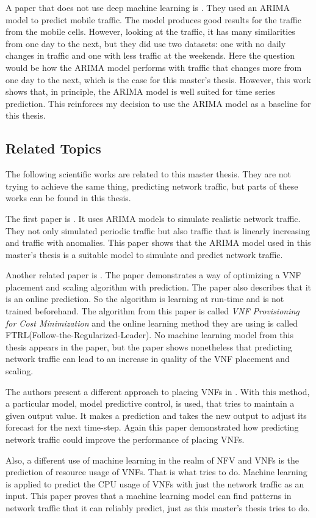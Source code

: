 A paper that does not use deep machine learning is \cite{mobileARIMA}.
They used an ARIMA model to predict mobile traffic.
The model produces good results for the traffic from the mobile cells.
However, looking at the traffic, it has many similarities from one day to the next, but they did use two datasets: one with no daily changes in traffic and one with less traffic at the weekends.
Here the question would be how the ARIMA model performs with traffic that changes more from one day to the next, which is the case for this master's thesis.
However, this work shows that, in principle, the ARIMA model is well suited for time series prediction.
This reinforces my decision to use the ARIMA model as a baseline for this thesis.

\subsection{Related Topics}
The following scientific works are related to this master thesis. They are not trying to achieve the same thing, predicting network traffic, but parts of these works can be found in this thesis.

The first paper is \cite{ArimaTraffic}.
It uses ARIMA models to simulate realistic network traffic.
They not only simulated periodic traffic but also traffic that is linearly increasing and traffic with anomalies.
This paper shows that the ARIMA model used in this master's thesis is a suitable model to simulate and predict network traffic.

Another related paper is \cite{8486320}.
The paper demonstrates a way of optimizing a VNF placement and scaling algorithm with prediction.
The paper also describes that it is an online prediction.
So the algorithm is learning at run-time and is not trained beforehand.
The algorithm from this paper is called \textit{VNF Provisioning for Cost Minimization} and the online learning method they are using is called FTRL(Follow-the-Regularized-Leader).
No machine learning model from this thesis appears in the paper, but the paper shows nonetheless that predicting network traffic can lead to an increase in quality of the VNF placement and scaling.

The authors present a different approach to placing VNFs in \cite{7502957}.
With this method, a particular model, model predictive control, is used, that tries to maintain a given output value.
It makes a prediction and takes the new output to adjust its forecast for the next time-step.
Again this paper demonstrated how predicting network traffic could improve the performance of placing VNFs.

Also, a different use of machine learning in the realm of NFV and VNFs is the prediction of resource usage of VNFs.
That is what \cite{resourceMachineLearningTechniques} tries to do.
Machine learning is applied to predict the CPU usage of VNFs with just the network traffic as an input.
This paper proves that a machine learning model can find patterns in network traffic that it can reliably predict, just as this master's thesis tries to do.